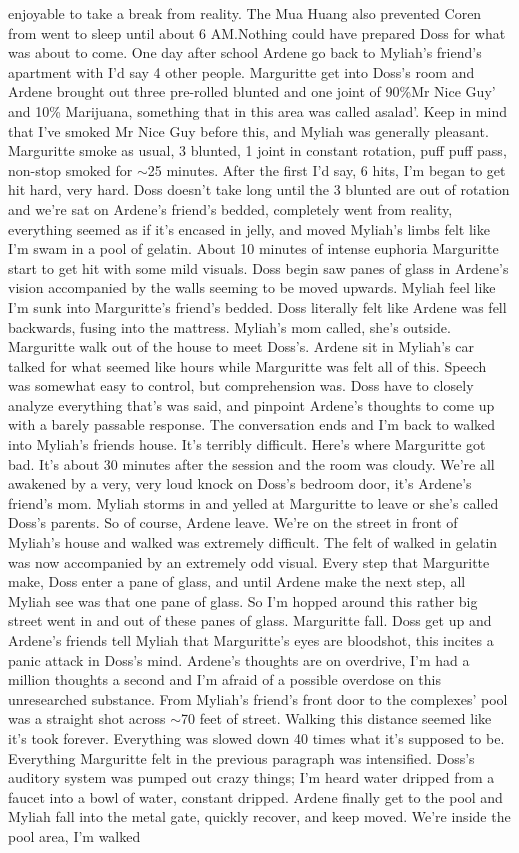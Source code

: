 \documentclass[12pt]{book}
\begin{document}
enjoyable to take a break from reality. The Mua Huang also prevented Coren from went to sleep until about 6 AM.Nothing could have prepared Doss for what was about to come. One day after school Ardene go back to Myliah's friend's apartment with I'd say 4 other people. Marguritte get into Doss's room and Ardene brought out three pre-rolled blunted and one joint of 90\%Mr Nice Guy' and 10\% Marijuana, something that in this area was called asalad'. Keep in mind that I've smoked Mr Nice Guy before this, and Myliah was generally pleasant. Marguritte smoke as usual, 3 blunted, 1 joint in constant rotation, puff puff pass, non-stop smoked for $\sim$25 minutes. After the first I'd say, 6 hits, I'm began to get hit hard, very hard. Doss doesn't take long until the 3 blunted are out of rotation and we're sat on Ardene's friend's bedded, completely went from reality, everything seemed as if it's encased in jelly, and moved Myliah's limbs felt like I'm swam in a pool of gelatin. About 10 minutes of intense euphoria Marguritte start to get hit with some mild visuals. Doss begin saw panes of glass in Ardene's vision accompanied by the walls seeming to be moved upwards. Myliah feel like I'm sunk into Marguritte's friend's bedded. Doss literally felt like Ardene was fell backwards, fusing into the mattress. Myliah's mom called, she's outside. Marguritte walk out of the house to meet Doss's. Ardene sit in Myliah's car talked for what seemed like hours while Marguritte was felt all of this. Speech was somewhat easy to control, but comprehension was. Doss have to closely analyze everything that's was said, and pinpoint Ardene's thoughts to come up with a barely passable response. The conversation ends and I'm back to walked into Myliah's friends house. It's terribly difficult. Here's where Marguritte got bad. It's about 30 minutes after the session and the room was cloudy. We're all awakened by a very, very loud knock on Doss's bedroom door, it's Ardene's friend's mom. Myliah storms in and yelled at Marguritte to leave or she's called Doss's parents. So of course, Ardene leave. We're on the street in front of Myliah's house and walked was extremely difficult. The felt of walked in gelatin was now accompanied by an extremely odd visual. Every step that Marguritte make, Doss enter a pane of glass, and until Ardene make the next step, all Myliah see was that one pane of glass. So I'm hopped around this rather big street went in and out of these panes of glass. Marguritte fall. Doss get up and Ardene's friends tell Myliah that Marguritte's eyes are bloodshot, this incites a panic attack in Doss's mind. Ardene's thoughts are on overdrive, I'm had a million thoughts a second and I'm afraid of a possible overdose on this unresearched substance. From Myliah's friend's front door to the complexes' pool was a straight shot across $\sim$70 feet of street. Walking this distance seemed like it's took forever. Everything was slowed down 40 times what it's supposed to be. Everything Marguritte felt in the previous paragraph was intensified. Doss's auditory system was pumped out crazy things; I'm heard water dripped from a faucet into a bowl of water, constant dripped. Ardene finally get to the pool and Myliah fall into the metal gate, quickly recover, and keep moved. We're inside the pool area, I'm walked 
\end{document}
